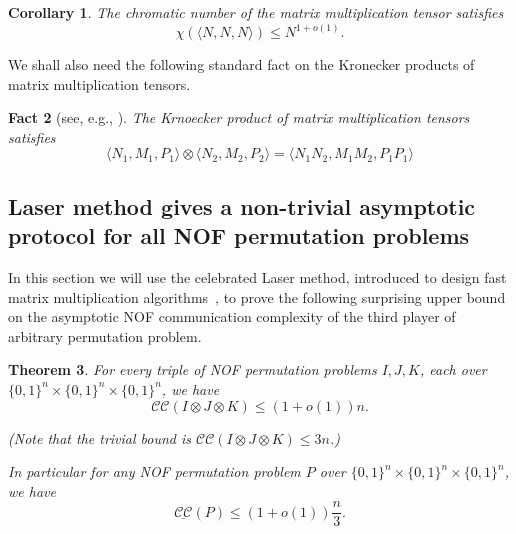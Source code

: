 \documentclass[10pt,a4paper]{article}
\newtheorem{theorem}{Theorem}
\newtheorem{fact}[theorem]{Fact}
\newtheorem{corollary}[theorem]{Corollary}
\newcommand{\F}{\mathbb{F}}
\newcommand{\cc}{\mathcal{CC}}
\newcommand{\acc}{\underline{\cc}}
\newcommand{\inprod}[1]{\langle #1 \rangle}
\begin{document}
\begin{corollary}
\label{cor:mat-mult-coloring}
The chromatic number of the matrix multiplication tensor satisfies
\begin{equation*}
    \chi(\inprod{N,N,N}) \leq N^{1 + o(1)}.
\end{equation*}
\end{corollary}

We shall also need the following standard fact on the Kronecker products of matrix multiplication tensors.
\begin{fact}[see, e.g., {\cite[{Page 24}]{B13}}]
    \label{fct:mat-mult-product}
    The Krnoecker product of matrix multiplication tensors satisfies
    \begin{equation*}
        \inprod{N_1, M_1, P_1} \otimes \inprod{N_2, M_2, P_2} = \inprod{N_1 N_2, M_1 M_2, P_1 P_1}
    \end{equation*}
\end{fact}

\subsection{Laser method gives a non-trivial asymptotic protocol for all NOF permutation problems}
In this section we will use the celebrated Laser method, introduced to design fast matrix multiplication algorithms~\cite{S86,CW87}, to prove the following surprising upper bound on the asymptotic NOF communication complexity of the third player of arbitrary permutation problem.
\begin{theorem}
\label{thm:laser-method-ub}
For every triple of NOF permutation problems $I, J, K$, each over $\{0,1\}^n \times \{0,1\}^n \times \{0,1\}^n$, we have
\begin{equation*}
    \cc(I \otimes J \otimes K) \leq (1 + o(1))n.
\end{equation*}

(Note that the trivial bound is $\cc(I \otimes J \otimes K) \leq 3n$.)

In particular for any NOF permutation problem $P$ over $\{0,1\}^n \times \{0,1\}^n \times \{0,1\}^n$, we have 
\begin{equation*}
    \acc(P) \leq (1 + o(1))\frac{n}{3}.
\end{equation*}
\end{theorem}

\end{document}
